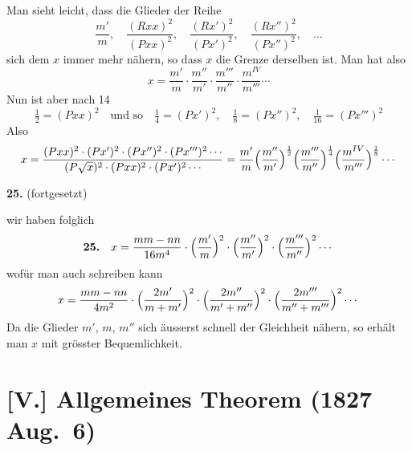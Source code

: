 \documentclass[10pt,a4paper]{article}
\begin{document}
Man sieht leicht, dass die Glieder der Reihe
%
\begin{equation*}
\frac{m'}{m}, \quad \frac{(Rxx)^2}{(Pxx)^2}, \quad \frac{(Rx')^2}{(Px')^2}, \quad \frac{(Rx'')^2}{(Px'')^2}, \quad \ldots
\end{equation*}
%
sich dem $x$ immer mehr n\"ahern, so dass $x$ die Grenze derselben ist. Man hat also
%
\begin{equation*}
x = \frac{m'}{m} \cdot \frac{m''}{m'} \cdot \frac{m'''}{m''} \cdot \frac{m^{IV}}{m'''} \cdots
\end{equation*}
%
Nun ist aber nach 14
%
\begin{equation*}
\tfrac{1}{2} = (Pxx)^2 \quad \text{und so} \quad \tfrac{1}{4} = (Px')^2, \quad \tfrac{1}{8} = (Px'')^2, \quad \tfrac{1}{16} = (Px''')^2
\end{equation*}
%
Also
%
\begin{equation*}
x = \frac{(Pxx)^2 \cdot (Px')^2 \cdot (Px'')^2 \cdot (Px''')^2 \cdots}{(P\sqrt{x})^2 \cdot (Pxx)^2 \cdot (Px')^2 \cdots}
= \frac{m'}{m} \Bigl(\frac{m''}{m'}\Bigr)^{\frac{1}{2}} \Bigl(\frac{m'''}{m''}\Bigr)^{\frac{1}{4}} \Bigl(\frac{m^{IV}}{m'''}\Bigr)^{\frac{1}{8}} \cdots
\end{equation*}

\newpage
\textbf{25.} (fortgesetzt)

wir haben folglich
%
\begin{equation*}
\textbf{25.} \quad x = \frac{mm - nn}{16m^4} \cdot \Bigl(\frac{m'}{m}\Bigr)^2 \cdot \Bigl(\frac{m''}{m'}\Bigr)^2 \cdot \Bigl(\frac{m'''}{m''}\Bigr)^2 \cdots
\end{equation*}
%
wof\"ur man auch schreiben kann
%
\begin{equation*}
x = \frac{mm - nn}{4m^2} \cdot \Bigl(\frac{2m'}{m + m'}\Bigr)^2 \cdot \Bigl(\frac{2m''}{m' + m''}\Bigr)^2 \cdot \Bigl(\frac{2m'''}{m'' + m'''}\Bigr)^2 \cdots
\end{equation*}
%
Da die Glieder $m'$, $m$, $m''$ sich \"ausserst schnell der Gleichheit n\"ahern, so erh\"alt man $x$ mit gr\"osster Bequemlichkeit.

\section*{[V.] Allgemeines Theorem (1827 Aug.\ 6)}
\end{document}
